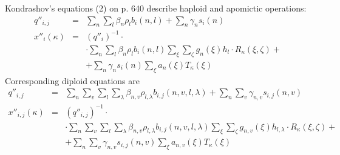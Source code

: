 % 
%
%
\renewcommand{\baselinestretch}{2}
%

Kondrashov's equations (2) on p. 640 describe haploid and apomictic operations:
\begin{eqnarray}
q''_{i,j} & = & \sum\limits_n {\sum\limits_l {\beta _n } } \rho _l b_i (n,l) + \sum\limits_n {\gamma _n s_i (n) } \label{eq:k1985:k2a} \\
x''_i (\kappa ) & = & (q''_i )^{ - 1} \cdot \label{eq:k1985:k2b} \\
 & & \cdot \sum\limits_n {\sum\limits_l {\beta _n } } \rho _l b_i (n,l)\sum\limits_\xi  {\sum\limits_\zeta  {g_n (\xi )h_l  \cdot R_\kappa  (\xi ,\zeta )} }  + \nonumber \\
 &  & + \sum\limits_n {\gamma _n s_i (n)} \sum\limits_\xi  {a_n (\xi )T_\kappa  (\xi )} \nonumber
\end{eqnarray}
Corresponding diploid equations are
\begin{eqnarray}
q''_{i,j} & = & \sum\limits_n {\sum\limits_v {\sum\limits_l {\sum\limits_\lambda  {\beta _{n,v} } } } } \rho _{l,\lambda } b_{i,j} (n,v,l,\lambda ) + \sum\limits_n {\sum\limits_v {\gamma _{n,v} s_{i,j} (n,v)} } \label{eq:k1985:2a} \\
x''_{i,j} (\kappa ) & = & (q''_{i,j}) ^{ - 1} \cdot \label{eq:k1985:2b} \\
 &  & \cdot \sum\limits_n {\sum\limits_v {\sum\limits_l {\sum\limits_\lambda  {\beta _{n,v} } } } } \rho _{l,\lambda } b_{i,j} (n,v,l,\lambda )\sum\limits_\xi  {\sum\limits_\zeta  {g_{n,v} (\xi )h_{l,\lambda }  \cdot R_\kappa  (\xi ,\zeta )} } \nonumber + \\
 &  & + \sum\limits_n {\sum\limits_v {\gamma _{n,v} s_{i,j} (n,v)} } \sum\limits_\xi  {a_{n,v} (\xi )T_\kappa  (\xi )} \nonumber
\end{eqnarray}

